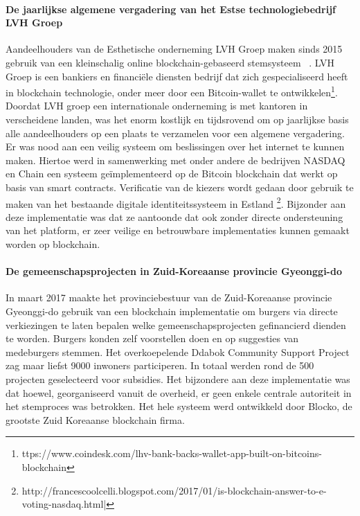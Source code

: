 				\paragraph{De jaarlijkse algemene vergadering van het Estse technologiebedrijf LVH Groep}
				Aandeelhouders van de Esthetische onderneming LVH Groep maken sinds 2015 gebruik van een kleinschalig online blockchain-gebaseerd stemsysteem ~\autocite{Kshetri2018}. LVH Groep is een bankiers en financiële diensten bedrijf dat zich gespecialiseerd heeft in blockchain technologie, onder meer door een Bitcoin-wallet te ontwikkelen\footnote{ttps://www.coindesk.com/lhv-bank-backs-wallet-app-built-on-bitcoins-blockchain}. Doordat LVH groep een internationale onderneming is met kantoren in verscheidene landen, was het enorm kostlijk en tijdsrovend om op jaarlijkse basis alle aandeelhouders op een plaats te verzamelen voor een algemene vergadering. Er was  nood aan een veilig systeem om beslissingen over het internet te kunnen maken. Hiertoe werd in samenwerking met onder andere de bedrijven NASDAQ en Chain een systeem geïmplementeerd op de Bitcoin blockchain dat werkt op basis van smart contracts. Verificatie van de kiezers wordt gedaan door gebruik te maken van het bestaande digitale identiteitssysteem in Estland \footnote{http://francescoolcelli.blogspot.com/2017/01/is-blockchain-answer-to-e-voting-nasdaq.html|}. Bijzonder aan deze implementatie was dat ze aantoonde dat ook zonder directe ondersteuning van het platform, er zeer veilige en betrouwbare implementaties kunnen gemaakt worden op blockchain. ~\autocite{Kshetri2018}
				
				\paragraph{De gemeenschapsprojecten in Zuid-Koreaanse provincie Gyeonggi-do}
				In maart 2017 maakte het provinciebestuur van de Zuid-Koreaanse provincie Gyeonggi-do gebruik van een blockchain implementatie om burgers via directe verkiezingen te laten  bepalen welke gemeenschapsprojecten gefinancierd dienden te worden. Burgers konden zelf voorstellen doen en op suggesties van medeburgers stemmen. Het overkoepelende Ddabok Community Support Project zag maar liefst 9000 inwoners participeren. In totaal werden rond de 500  projecten geselecteerd voor subsidies. Het bijzondere aan deze implementatie was dat hoewel, georganiseerd vanuit de overheid, er geen enkele centrale autoriteit in het stemproces was betrokken. Het hele systeem werd ontwikkeld door Blocko, de grootste Zuid Koreaanse blockchain firma. ~\autocite{Kshetri2018}
				
